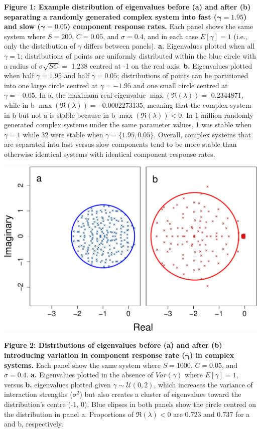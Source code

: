 \documentclass[]{article}
\begin{document}
\clearpage

\textbf{Figure 1: Example distribution of eigenvalues before (a) and
after (b) separating a randomly generated complex system into fast
(\(\boldsymbol{\gamma} = 1.95\)) and slow
(\(\boldsymbol{\gamma} = 0.05\)) component response rates.} Each panel
shows the same system where \(S = 200\), \(C = 0.05\), and
\(\sigma = 0.4\), and in each case \(E[\gamma] = 1\) (i.e., only the
distribution of \(\gamma\) differs between panels). \textbf{a.}
Eigenvalues plotted when all \(\gamma = 1\); distributions of points are
uniformly distributed within the blue circle with a radius of
\(\sigma\sqrt{SC} =\) 1.238 centred at -1 on the real axis. \textbf{b.}
Eigenvalues plotted when half \(\gamma = 1.95\) and half
\(\gamma = 0.05\); distributions of points can be partitioned into one
large circle centred at \(\gamma = -1.95\) and one small circle centred
at \(\gamma = -0.05\). In a, the maximum real eigenvalue
\(\max\left(\Re(\lambda)\right) =\) 0.2344871, while in b
\(\max\left(\Re(\lambda)\right) =\) -0.0002273135, meaning that the
complex system in b but not a is stable because in b
\(\max\left(\Re(\lambda)\right) < 0\). In 1 million randomly generated
complex systems under the same parameter values, 1 was stable when
\(\gamma = 1\) while 32 were stable when \(\gamma = \{1.95, 0.05\}\).
Overall, complex systems that are separated into fast versus slow
components tend to be more stable than otherwise identical systems with
identical component response rates.

\includegraphics{ms_files/figure-latex/unnamed-chunk-10-1.pdf}

\clearpage

\textbf{Figure 2: Distributions of eigenvalues before (a) and after (b)
introducing variation in component response rate
(\(\boldsymbol{\gamma}\)) in complex systems.} Each panel show the same
system where \(S = 1000\), \(C = 0.05\), and \(\sigma = 0.4\).
\textbf{a.} Eigenvalues plotted in the absence of \(Var(\gamma)\) where
\(E[\gamma] = 1\), versus \textbf{b.} eigenvalues plotted given
\(\gamma \sim \mathcal{U}(0, 2)\), which increases the variance of
interaction strengths (\(\sigma^{2}\)) but also creates a cluster of
eigenvalues toward the distribution's centre (-1, 0). Blue elipses in
both panels show the circle centred on the distribution in panel a.
Proportions of \(\Re(\lambda) < 0\) are 0.723 and 0.737 for a and b,
respectively.
\end{document}
